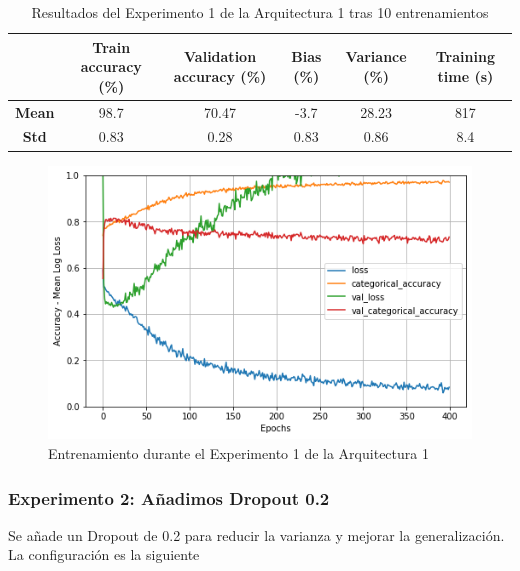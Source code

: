 \documentclass{article}
\begin{document}
            \begin{table}[!h]
				\begin{center}
					\begin{tabular}{ c | c | c | c | c | c |}
						\ & \textbf{Train accuracy (\%)} & \textbf{Validation accuracy (\%)} & \textbf{Bias (\%)} & \textbf{Variance (\%)} & \textbf{Training time (s)} \\ \hline
						\textbf{Mean} & 98.7 & 70.47 & -3.7  & 28.23 & 817   \\ \hline
						\textbf{Std} &  0.83 & 0.28 &  0.83 & 0.86 & 8.4  \\ \hline
					\end{tabular}
					\caption{Resultados del Experimento 1 de la Arquitectura 1 tras 10 entrenamientos}
					\label{tab:res-a2-e5}
				\end{center}
			\end{table}
            
            \begin{figure}[!h]
				\begin{center}
					\includegraphics[scale=0.5]{tr-a6-e1.png}		
					\caption{Entrenamiento durante el Experimento 1 de la Arquitectura 1}	
					\label{tab:tr-a6-e1}
				\end{center}
			\end{figure}
   			\newpage
        \subsubsection{Experimento 2: A\~{n}adimos Dropout 0.2}
        \label{s-a6-e2}
            Se a\~{n}ade un Dropout de 0.2 para reducir la varianza y mejorar la generalizaci\'on. La configuraci\'on es la siguiente
 
\end{document}
